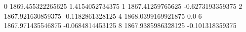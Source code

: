 0 1869.455322265625 1.4154052734375
1 1867.41259765625 -0.6273193359375
2 1867.921630859375 -0.1182861328125
4 1868.0399169921875 0.0
6 1867.971435546875 -0.0684814453125
8 1867.9385986328125 -0.101318359375
